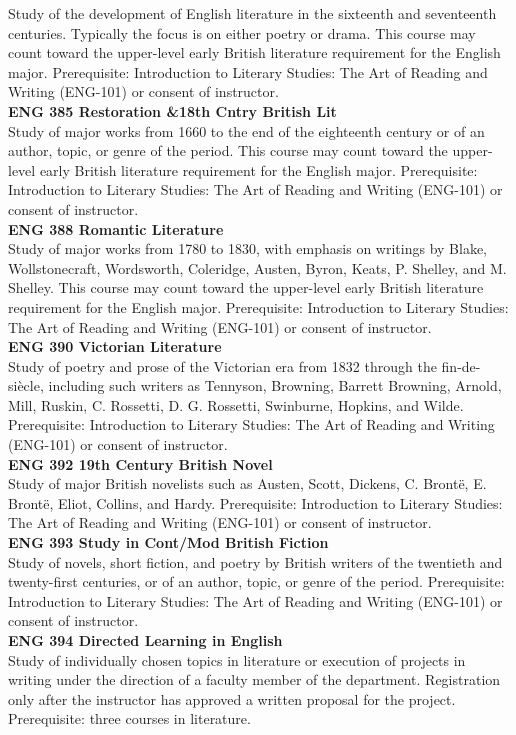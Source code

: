 \documentclass[
  letterpaper,
]{scrbook}
\begin{document}
Study of the development of English literature in the sixteenth and
seventeenth centuries. Typically the focus is on either poetry or drama.
This course may count toward the upper-level early British literature
requirement for the English major. Prerequisite: Introduction to
Literary Studies: The Art of Reading and Writing (ENG-101) or consent of
instructor.\\
\textbf{ENG 385 Restoration \&18th Cntry British Lit}\\
Study of major works from 1660 to the end of the eighteenth century or
of an author, topic, or genre of the period. This course may count
toward the upper-level early British literature requirement for the
English major. Prerequisite: Introduction to Literary Studies: The Art
of Reading and Writing (ENG-101) or consent of instructor.\\
\textbf{ENG 388 Romantic Literature}\\
Study of major works from 1780 to 1830, with emphasis on writings by
Blake, Wollstonecraft, Wordsworth, Coleridge, Austen, Byron, Keats, P.
Shelley, and M. Shelley. This course may count toward the upper-level
early British literature requirement for the English major.
Prerequisite: Introduction to Literary Studies: The Art of Reading and
Writing (ENG-101) or consent of instructor.\\
\textbf{ENG 390 Victorian Literature}\\
Study of poetry and prose of the Victorian era from 1832 through the
fin-de-siècle, including such writers as Tennyson, Browning, Barrett
Browning, Arnold, Mill, Ruskin, C. Rossetti, D. G. Rossetti, Swinburne,
Hopkins, and Wilde. Prerequisite: Introduction to Literary Studies: The
Art of Reading and Writing (ENG-101) or consent of instructor.\\
\textbf{ENG 392 19th Century British Novel}\\
Study of major British novelists such as Austen, Scott, Dickens, C.
Brontë, E. Brontë, Eliot, Collins, and Hardy. Prerequisite: Introduction
to Literary Studies: The Art of Reading and Writing (ENG-101) or consent
of instructor.\\
\textbf{ENG 393 Study in Cont/Mod British Fiction}\\
Study of novels, short fiction, and poetry by British writers of the
twentieth and twenty-first centuries, or of an author, topic, or genre
of the period. Prerequisite: Introduction to Literary Studies: The Art
of Reading and Writing (ENG-101) or consent of instructor.\\
\textbf{ENG 394 Directed Learning in English}\\
Study of individually chosen topics in literature or execution of
projects in writing under the direction of a faculty member of the
department. Registration only after the instructor has approved a
written proposal for the project. Prerequisite: three courses in
literature.
\end{document}

